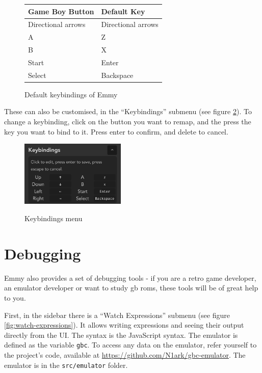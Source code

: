 \begin{figure}[h]
    \centering
    \begin{tabular}{|l|l|}
    \hline
    \textbf{Game Boy Button} & \textbf{Default Key} \\ \hline
    Directional arrows & Directional arrows \\ \hline
    A & Z \\ \hline
    B & X \\ \hline
    Start & Enter \\ \hline
    Select & Backspace \\ \hline
    \end{tabular}
    \caption{Default keybindings of Emmy}
    \label{fig:default-keybindings}
\end{figure}

These can also be customised, in the ``Keybindings'' submenu (see figure \ref{fig:keybindings}). To change a keybinding, click on the button you want to remap, and the press the key you want to bind to it. Press enter to confirm, and delete to cancel.

\begin{figure}[h]
    \centering
    \includegraphics[width=5cm]{images/keybindings}\\
    \caption{Keybindings menu}
    \label{fig:keybindings}
\end{figure}

\section{Debugging}

Emmy also provides a set of debugging tools - if you are a retro game developer, an emulator developer or want to study \glsdesc{gb} \glspl{rom}, these tools will be of great help to you.

First, in the sidebar there is a ``Watch Expressions'' submenu (see figure \ref{fig:watch-expressions}). It allows writing expressions and seeing their output directly from the UI. The syntax is the JavaScript syntax. The emulator is defined as the variable \texttt{gbc}. To access any data on the emulator, refer yourself to the project's code, available at \url{https://github.com/N1ark/gbc-emulator}. The emulator is in the \texttt{src/emulator} folder.

